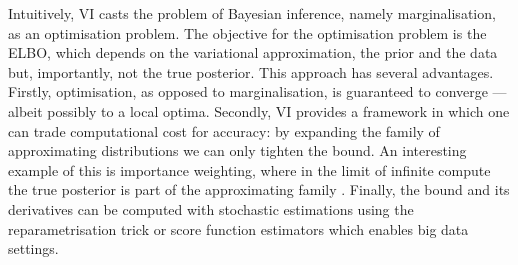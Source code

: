 Intuitively, VI casts the problem of Bayesian inference, namely marginalisation, as an optimisation problem. The objective for the optimisation problem is the ELBO, which depends on the variational approximation, the prior and the data but, importantly, not the true posterior. This approach has several advantages. Firstly, optimisation, as opposed to marginalisation, is guaranteed to converge ---albeit possibly to a local optima. Secondly, VI provides a framework in which one can trade computational cost for accuracy: by expanding the family of approximating distributions we can only tighten the bound. An interesting example of this is importance weighting, where in the limit of infinite compute the true posterior is part of the approximating family \citep{Domke2018IWVI}. Finally, the bound and its derivatives can be computed with stochastic estimations using the reparametrisation trick or score function estimators which enables big data settings.

